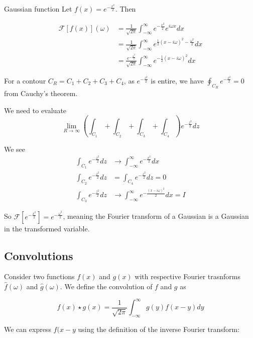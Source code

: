 \documentclass{../../physics_notes}
\newcommand{\intfty}{\int_{-\infty}^\infty}
\begin{document}
\begin{example}{Gaussian function}
Let $f(x) = e^{-\frac{x^2}{2}}$. Then

\begin{align*}
\mathcal{F}\left[f(x)\right](\omega) &= \frac{1}{\sqrt{2\pi}}\int_{-\infty}^\infty e^{-\frac{x^2}{2}} e^{i\omega x} dx \\
&= \frac{1}{\sqrt{2\pi}}\int_{-\infty}^\infty e^{\frac{1}{2}(x - i\omega)^2 - \frac{\omega^2}{2}} dx \\
&= \frac{e^{-\frac{\omega^2}{2}}}{\sqrt{2\pi}}\int_{-\infty}^\infty e^{-\frac{1}{2}(x - i\omega)^2} dx
\end{align*}

For a contour $C_R = C_1 + C_2 + C_3 + C_4$, as $e^{-\frac{z^2}{2}}$ is entire, we have $\oint_{C_R} e^{-\frac{z^2}{2}} = 0$ from Cauchy's theorem.

We need to evaluate 
\[ \lim_{R\to\infty} \left(\int_{C_1} + \int_{C_2} + \int_{C_3} + \int_{C_4}\right)e^{-\frac{z^2}{2}}dz\]

We see 
\begin{align*}
\int_{C_1} e^{-\frac{z^2}{2}} dz &\to \int_{-\infty}^\infty e^{-\frac{x^2}{2}} dx \\
\int_{C_2} e^{-\frac{z^2}{2}} dz &= \int_{C_4} e^{-\frac{z^2}{2}} dz  = 0 \\
\int_{C_3} e^{-\frac{z^2}{2}} dz &\to \int_{-\infty}^\infty e^{-\frac{(x-i\omega)^2}{2}} dx = I
\end{align*}

So $\mathcal{F}\left[e^{-\frac{x^2}{2}}\right] = e^{-\frac{\omega^2}{2}}$, meaning the Fourier transform of a Gaussian is a Gaussian in the transformed variable.
\end{example}

\subsection{Convolutions}

Consider two functions $f(x)$ and $g(x)$ with respective Fourier trasnforms $\hat{f}(\omega)$ and $\hat{g}(\omega)$. We define the convolution of $f$ and $g$ as 

\begin{equation}\label{eq:f_convolution}
f(x) \star g(x) = \frac{1}{\sqrt{2\pi}}\intfty g(y)f(x-y)dy
\end{equation}

We can express $f(x-y$ using the definition of the inverse Fourier transform:
\end{document}
